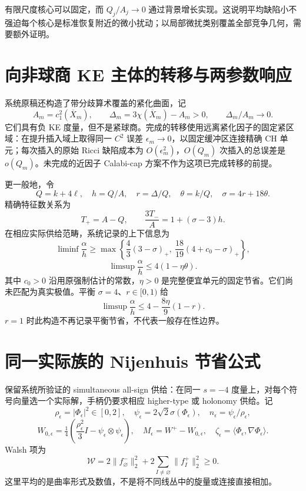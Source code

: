 \documentclass[UTF8,11pt,fontset=none]{ctexart}
\theoremstyle{definition}
\theoremstyle{remark}
\begin{document}
有限尺度核心可以固定，而 \(Q_j/A_j\to0\) 通过背景增长实现。这说明平均缺陷小不强迫每个核心是标准恢复附近的微小扰动；以局部微扰类别覆盖全部竞争几何，需要额外证明。

\section{向非球商 KE 主体的转移与两参数响应}\label{v7-ux5411ux975eux7403ux5546-ke-ux4e3bux4f53ux7684ux8f6cux79fbux4e0eux4e24ux53c2ux6570ux54cdux5e94}

系统原稿还构造了带分歧算术覆盖的紧化曲面，记 \[
 A_m=c_1^2(\overline X_m),\qquad
 \Delta_m=3\chi(\overline X_m)-A_m>0,
 \qquad\Delta_m/A_m\to0.
\] 它们具有负 KE 度量，但不是紧球商。完成的转移使用远离紧化因子的固定紧区域：在提升插入域上取得同一 \(C^2\) 误差 \(\epsilon_m\to0\)，以固定缓冲区连接精确 CH 单元；每次插入的原始 Ricci 缺陷成本为 \(O(\epsilon_m^2)\)，\(O(Q_m)\) 次插入的总误差是 \(o(Q_m)\)。未完成的近因子 Calabi-cap 方案不作为这项已完成转移的前提。\cite{B01,B02,B05}

更一般地，令 \[
 Q=k+4\ell,\quad h=Q/A,\quad
 r=\Delta/Q,\quad\theta=k/Q,\quad\sigma=4r+18\theta.
\] 精确特征数关系为 \[
 T_+=A-Q,\qquad \frac{3T_-}{A}=1+(\sigma-3)h.
\] 在相应实际供给范畴，系统记录的上下信息为 \[
 \liminf\frac\alpha h\ge
 \max\left\{\frac43(3-\sigma)_+,\
 \frac{18}{19}(4+c_0-\sigma)_+\right\},
\tag{7.4}
\] \[
 \limsup\frac\alpha h\le4(1-\eta\theta).
\tag{7.5}
\] 其中 \(c_0>0\) 沿用原强制估计的常数，\(\eta>0\) 是完整便宜单元的固定节省。它们尚未匹配为真实极值。平衡 \(\sigma=4\)、\(r\in[0,1)\) 给 \[
 \limsup\frac\alpha h\le4-\frac{8\eta}{9}(1-r).
\] \(r=1\) 时此构造不再记录平衡节省，不代表一般存在性边界。

\section{同一实际族的 Nijenhuis 节省公式}\label{v7-ux540cux4e00ux5b9eux9645ux65cfux7684-nijenhuis-ux8282ux7701ux516cux5f0f}

保留系统所验证的 simultaneous all-sign 供给：在同一 \(s=-4\) 度量上，对每个符号向量选一个实际解，手柄仍要求相应 higher-type 或 holonomy 供给。记 \[
 \rho_\epsilon=|\Phi_\epsilon|^2\in[0,2],\quad
 \psi_\epsilon=2\sqrt2\sigma(\Phi_\epsilon),\quad
 n_\epsilon=\psi_\epsilon/\rho_\epsilon,
\] \[
 W_{0,\epsilon}=\tfrac14\left(\frac{\rho_\epsilon^2}{3}I-
 \psi_\epsilon\otimes\psi_\epsilon\right),\quad
 M_\epsilon=W^+-W_{0,\epsilon},\quad
 \zeta_\epsilon=\langle\Phi_\epsilon,\nabla\Phi_\epsilon\rangle.
\] Walsh 项为 \[
 \mathcal W=2\|f_\varnothing^-\|_2^2+
 2\sum_{I\ne\varnothing}\|f_I^+\|_2^2\ge0.
\] 这里平均的是曲率形式及数值，不是将不同线丛中的旋量或连接直接相加。\cite{B03}
\end{document}
